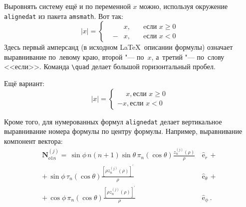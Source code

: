 Выровнять систему ещё и по переменной \( x \) можно, используя окружение
\verb|alignedat| из пакета \verb|amsmath|. Вот так:
\[
|x| = \left\{
\begin{alignedat}{2}
    &&x, \quad &\text{eсли } x\geqslant 0 \\
    &-&x, \quad & \text{eсли } x<0
\end{alignedat}
\right.
\]
Здесь первый амперсанд (в исходном \LaTeX\ описании формулы) означает
выравнивание по~левому краю, второй "--- по~\( x \), а~третий "--- по~слову
<<если>>. Команда \verb|\quad| делает большой горизонтальный пробел.

Ещё вариант:
\[
    |x|=
    \begin{cases}
        \phantom{-}x, \text{если } x \geqslant 0 \\
        -x, \text{если } x<0
    \end{cases}
\]

Кроме того, для  нумерованных формул \verb|alignedat| делает вертикальное
выравнивание номера формулы по центру формулы. Например, выравнивание
компонент вектора:
\begin{equation}
    \label{eq:2p3}
    \begin{alignedat}{2}
        {\mathbf{N}}_{o1n}^{(j)} = \,{\sin} \phi\,n\!\left(n+1\right)
        {\sin}\theta\,
        \pi_n\!\left({\cos} \theta\right)
        \frac{
        z_n^{(j)}\!\left( \rho \right)
        }{\rho}\,
        &{\boldsymbol{\hat{\mathrm e}}}_{r}\,+   \\
        +\,
        {\sin} \phi\,
        \tau_n\!\left({\cos} \theta\right)
        \frac{
        \left[\rho z_n^{(j)}\!\left( \rho \right)\right]^{\prime}
        }{\rho}\,
        &{\boldsymbol{\hat{\mathrm e}}}_{\theta}\,+   \\
        +\,
        {\cos} \phi\,
        \pi_n\!\left({\cos} \theta\right)
        \frac{
        \left[\rho z_n^{(j)}\!\left( \rho \right)\right]^{\prime}
        }{\rho}\,
        &{\boldsymbol{\hat{\mathrm e}}}_{\phi}\:.
    \end{alignedat}
\end{equation}

